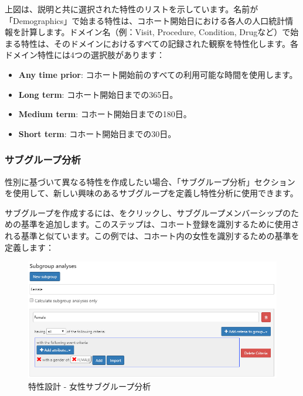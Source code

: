 \documentclass[
  11pt]{book}
\providecommand{\tightlist}{%
  \setlength{\itemsep}{0pt}\setlength{\parskip}{0pt}}
\theoremstyle{definition}
\theoremstyle{definition}
\theoremstyle{definition}
\theoremstyle{definition}
\theoremstyle{remark}
\begin{document}
上図は、説明と共に選択された特性のリストを示しています。名前が「Demographics」で始まる特性は、コホート開始日における各人の人口統計情報を計算します。ドメイン名（例：Visit, Procedure, Condition, Drugなど）で始まる特性は、そのドメインにおけるすべての記録された観察を特性化します。各ドメイン特性には4つの選択肢があります：

\begin{itemize}
\tightlist
\item
  \textbf{Any time prior}: コホート開始前のすべての利用可能な時間を使用します。
\item
  \textbf{Long term}: コホート開始日までの365日。
\item
  \textbf{Medium term}: コホート開始日までの180日。
\item
  \textbf{Short term}: コホート開始日までの30日。
\end{itemize}

\subsubsection*{サブグループ分析}\label{ux30b5ux30d6ux30b0ux30ebux30fcux30d7ux5206ux6790}

性別に基づいて異なる特性を作成したい場合、「サブグループ分析」セクションを使用して、新しい興味のあるサブグループを定義し特性分析に使用できます。

サブグループを作成するには、をクリックし、サブグループメンバーシップのための基準を追加します。このステップは、コホート登録を識別するために使用される基準と似ています。この例では、コホート内の女性を識別するための基準を定義します：

\begin{figure}

{\centering \includegraphics[width=1\linewidth]{images/Characterization/atlasCharacterizationSubgroup} 

}

\caption{特性設計 - 女性サブグループ分析}\label{fig:atlasCharacterizationSubgroup}
\end{figure}
\end{document}

